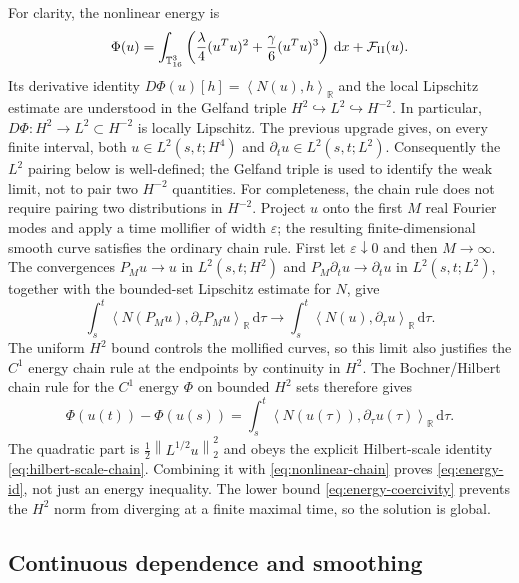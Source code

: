 \documentclass[11pt]{article}
\numberwithin{equation}{section}
\theoremstyle{definition}
\newcommand{\T}{\mathbb T}
\newcommand{\R}{\mathbb R}
\newcommand{\cF}{\mathcal F}
\newcommand{\dd}{\,\mathrm d}
\newcommand{\norm}[1]{\left\lVert#1\right\rVert}
\newcommand{\ip}[2]{\left\langle #1,#2\right\rangle}
\begin{document}
For clarity, the nonlinear energy is
\begin{equation}
 \Phi(u)=\int_{\T^3_{16}}\left(\frac\lambda4(u^Tu)^2
       +\frac\gamma6(u^Tu)^3\right)\dd x+\cF_{\rm II}(u).
 \label{eq:nonlinear-energy}
\end{equation}
Its derivative identity
$D\Phi(u)[h]=\ip{N(u)}{h}_{\R}$ and the local Lipschitz estimate are understood
in the Gelfand triple $H^2\hookrightarrow L^2\hookrightarrow H^{-2}$.  In
particular, $D\Phi:H^2\to L^2\subset H^{-2}$ is locally Lipschitz.  The
previous upgrade gives, on every finite interval, both
$u\in L^2(s,t;H^4)$ and $\partial_tu\in L^2(s,t;L^2)$.  Consequently the
$L^2$ pairing below is well-defined; the Gelfand triple is used to identify the
weak limit, not to pair two $H^{-2}$ quantities.  For completeness, the chain rule does not require pairing two distributions in
$H^{-2}$.  Project $u$ onto the first $M$ real Fourier modes and apply a time
mollifier of width $\varepsilon$; the resulting finite-dimensional smooth curve
satisfies the ordinary chain rule.  First let $\varepsilon\downarrow0$ and then
$M\to\infty$.  The convergences
$P_Mu\to u$ in $L^2(s,t;H^2)$ and $P_M\partial_tu\to\partial_tu$ in
$L^2(s,t;L^2)$, together with the bounded-set Lipschitz estimate for $N$, give
\begin{equation}
 \int_s^t\ip{N(P_Mu)}{\partial_\tau P_Mu}_{\R}\dd\tau
 \longrightarrow
 \int_s^t\ip{N(u)}{\partial_\tau u}_{\R}\dd\tau.
 \label{eq:chain-rule-limit}
\end{equation}
The uniform $H^2$ bound controls the mollified curves, so this limit also
justifies the $C^1$ energy chain rule at the endpoints by continuity in
$H^2$.  The Bochner/Hilbert chain
rule for the $C^1$ energy $\Phi$ on bounded $H^2$ sets therefore gives
\begin{equation}
 \Phi(u(t))-\Phi(u(s))=\int_s^t\ip{N(u(\tau))}{\partial_\tau u(\tau)}_{\R}\dd\tau.
 \label{eq:nonlinear-chain}
\end{equation}
The quadratic part is $\frac12\norm{L^{1/2}u}_2^2$ and obeys the
explicit Hilbert-scale identity \eqref{eq:hilbert-scale-chain}.  Combining it
with \eqref{eq:nonlinear-chain} proves \eqref{eq:energy-id}, not just an energy
inequality.  The
lower bound \eqref{eq:energy-coercivity} prevents
the $H^2$ norm from diverging at a finite maximal time, so the solution is
global.

\subsection{Continuous dependence and smoothing}
\end{document}
